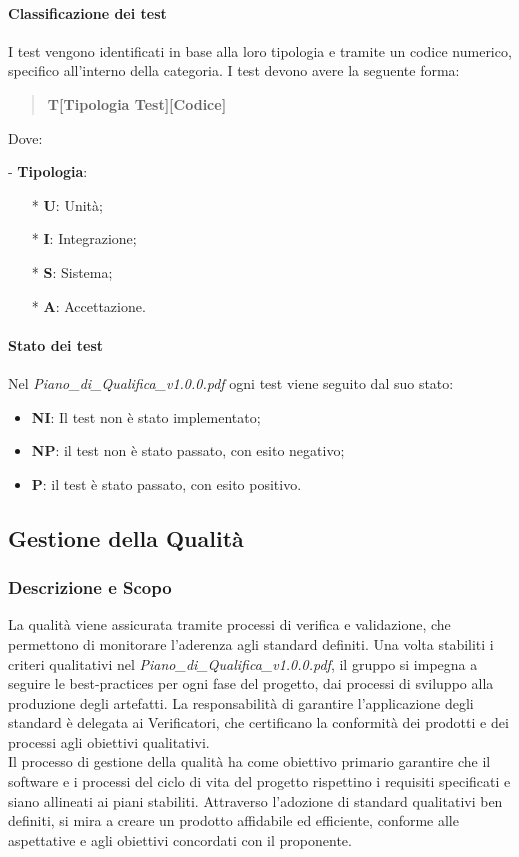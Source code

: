 \documentclass[10pt]{article}
\begin{document}
\begin{justify}
    \paragraph{Classificazione dei test}
    I test vengono identificati in base alla loro tipologia e tramite un codice numerico, specifico all'interno della categoria. I test devono avere la seguente forma:
    \begin{quote}
    \textbf{T[Tipologia Test][Codice]}\\
    \end{quote}
    Dove:
    \item [-] \textbf{Tipologia}:
    \begin{itemize}
        \item [*] \textbf{U}: Unità;
        \item [*] \textbf{I}: Integrazione;
        \item [*] \textbf{S}: Sistema;
        \item [*] \textbf{A}: Accettazione.
    \end{itemize}

    \paragraph{Stato dei test}
    Nel \textit{Piano\_di\_Qualifica\_v1.0.0.pdf} ogni test viene seguito dal suo stato:
    \begin{itemize}
    \item \textbf{NI}: Il test non è stato implementato;
    \item \textbf{NP}: il test non è stato passato, con esito negativo;
    \item \textbf{P}: il test è stato passato, con esito positivo.
    \end{itemize}

\subsection{Gestione della Qualità}

    \subsubsection{Descrizione e Scopo}
     La qualità viene assicurata tramite processi di verifica e validazione, che permettono di monitorare l'aderenza agli standard definiti. Una volta stabiliti i criteri qualitativi nel \textit{Piano\_di\_Qualifica\_v1.0.0.pdf}, il gruppo si impegna a seguire le best-practices per ogni fase del progetto, dai processi di sviluppo alla produzione degli artefatti. La responsabilità di garantire l'applicazione degli standard è delegata ai Verificatori, che certificano la conformità dei prodotti e dei processi agli obiettivi qualitativi.\\
     Il processo di gestione della qualità ha come obiettivo primario garantire che il software e i processi del ciclo di vita del progetto rispettino i requisiti specificati e siano allineati ai piani stabiliti. Attraverso l'adozione di standard qualitativi ben definiti, si mira a creare un prodotto affidabile ed efficiente, conforme alle aspettative e agli obiettivi concordati con il proponente.
    

\end{justify}
\end{document}
